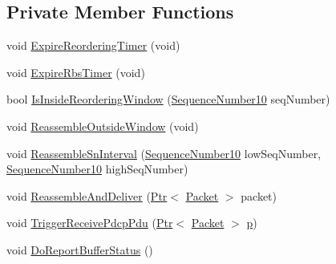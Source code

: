 \subsection*{Private Member Functions}
\begin{DoxyCompactItemize}
\item 
void \hyperlink{classns3_1_1LteRlcUm_af17c5fa995d3a0ca3b1e4edfd18e4c3d}{Expire\+Reordering\+Timer} (void)
\item 
void \hyperlink{classns3_1_1LteRlcUm_aaec66683c9a4e4b40965f0d85a3ce338}{Expire\+Rbs\+Timer} (void)
\item 
bool \hyperlink{classns3_1_1LteRlcUm_af9dc02493802d28c36558a1f1324cd4c}{Is\+Inside\+Reordering\+Window} (\hyperlink{classns3_1_1SequenceNumber10}{Sequence\+Number10} seq\+Number)
\item 
void \hyperlink{classns3_1_1LteRlcUm_a49f67e2001fc4609ef592ccda50606ab}{Reassemble\+Outside\+Window} (void)
\item 
void \hyperlink{classns3_1_1LteRlcUm_a6c396626a8b5e65d70783e603486c832}{Reassemble\+Sn\+Interval} (\hyperlink{classns3_1_1SequenceNumber10}{Sequence\+Number10} low\+Seq\+Number, \hyperlink{classns3_1_1SequenceNumber10}{Sequence\+Number10} high\+Seq\+Number)
\item 
void \hyperlink{classns3_1_1LteRlcUm_a103ba1e3d14eb2604a44d1bef7fe7cb7}{Reassemble\+And\+Deliver} (\hyperlink{classns3_1_1Ptr}{Ptr}$<$ \hyperlink{classns3_1_1Packet}{Packet} $>$ packet)
\item 
void \hyperlink{classns3_1_1LteRlcUm_ae1041db82eadf14d676c47e30214adfd}{Trigger\+Receive\+Pdcp\+Pdu} (\hyperlink{classns3_1_1Ptr}{Ptr}$<$ \hyperlink{classns3_1_1Packet}{Packet} $>$ \hyperlink{lte__link__budget__x2__handover__measures_8m_ac9de518908a968428863f829398a4e62}{p})
\item 
void \hyperlink{classns3_1_1LteRlcUm_a10fa1eb47a69669c1d0a61d1f8b05378}{Do\+Report\+Buffer\+Status} ()
\end{DoxyCompactItemize}
